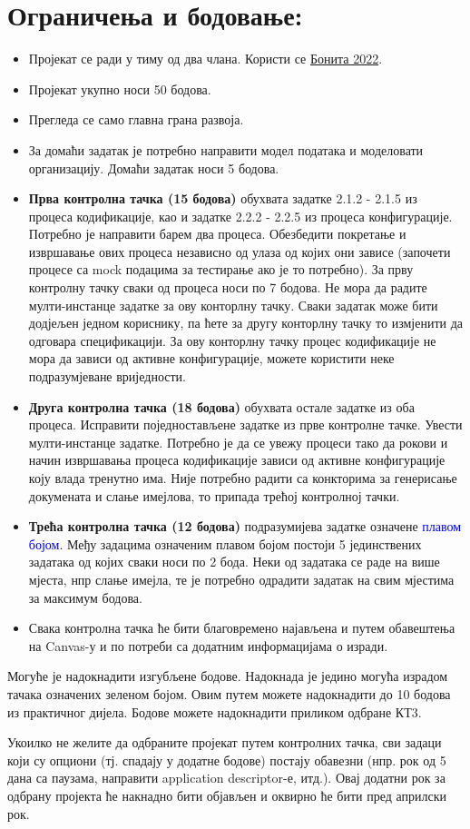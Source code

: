\documentclass[12pt,a4paper]{article}
\newcommand{\optional}[1]{\textcolor{blue}{#1}}
\newcommand{\bonus}[1]{\textcolor{emerald}{#1}}
\begin{document}
\section{Ограничења и бодовање:}

\begin{itemize}
    \item Пројекат се ради у тиму од два члана. Користи се \href{https://www.bonitasoft.com/old-versions}{Бонита 2022}.
    \item Пројекат укупно носи 50 бодова.
    \item Прегледа се само главна грана развоја.
    \item За домаћи задатак је потребно направити модел података и моделовати организацију. Домаћи задатак носи 5 бодова.
    \item \textbf{Прва контролна тачка (15 бодова)} обухвата задатке 2.1.2 - 2.1.5 из процеса кодификације, као и задатке 2.2.2 - 2.2.5 из процеса конфигурације. Потребно је направити барем два процеса. Обезбедити покретање и извршавање ових процеса независно од улаза од којих они зависе (започети процесе са mock подацима за тестирање ако је то потребно). За прву контролну тачку сваки од процеса носи по 7 бодова. Не мора да радите мулти-инстанце задатке за ову конторлну тачку. Сваки задатак може бити додјељен једном кориснику, па ћете за другу конторлну тачку то измјенити да одговара спецификацији. За ову конторлну тачку процес кодификације не мора да зависи од активне конфигурације, можете користити неке подразумјеване вриједности.
    \item \textbf{Друга контролна тачка (18 бодова)} обухвата остале задатке из оба процеса. Исправити поједностављене задатке из прве контролне тачке. Увести мулти-инстанце задатке. Потребно је да се увежу процеси тако да рокови и начин извршавања процеса кодификације зависи од активне конфигурације коју влада тренутно има. Није потребно радити са конкторима за генерисање докумената и слање имејлова, то припада трећој контролној тачки.
    \item \textbf{Трећа контролна тачка (12 бодова)} подразумијева задатке означене \optional{плавом бојом}. Међу задацима означеним плавом бојом постоји 5 јединствених задатака од којих сваки носи по 2 бода. Неки од задатака се раде на више мјеста, нпр слање имејла, те је потребно одрадити задатак на свим мјестима за максимум бодова.
    \item Свака контролна тачка ће бити благовремено најављена и путем обавештења на Canvas-у и по потреби са додатним информацијама о изради.
\end{itemize}

Могуће је надокнадити изгубљене бодове. Надокнада је једино могућа израдом тачака означених \bonus{зеленом бојом}. Овим путем можете надокнадити до 10 бодова из практичног дијела. Бодове можете надокнадити приликом одбране КТ3.

Укоилко не желите да одбраните пројекат путем контролних тачка, сви задаци који су опциони (тј. спадају у додатне бодове) постају обавезни (нпр. рок од 5 дана са паузама, направити application descriptor-е, итд.). Овај додатни рок за одбрану пројекта ће накнадно бити објављен и оквирно ће бити пред априлски рок.
\end{document}
